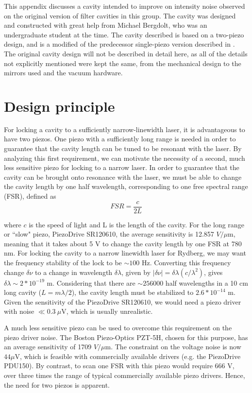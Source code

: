 This appendix discusses a cavity intended to improve on intensity noise observed on the original version of filter cavities in this group\cite{Young2022}. The cavity was designed and constructed with great help from Michael Bergdolt, who was an undergraduate student at the time. The cavity described is based on a two-piezo design, and is a modified of the predecessor single-piezo version described in \cite{kwon2019rydberg}. The original cavity design will not be described in detail here, as all of the details not explicitly mentioned were kept the same, from the mechanical design to the mirrors used and the vacuum hardware.

\section{Design principle}

For locking a cavity to a sufficiently narrow-linewidth laser, it is  advantageous to have two piezos\cite{Braverman2018}. One piezo with a sufficiently long range is needed in order to guarantee that the cavity length can be tuned to be resonant with the laser. By analyzing this first requirement, we can motivate the necessity of a second, much less sensitive piezo for locking to a narrow laser. In order to guarantee that the cavity can be brought onto resonance with the laser, we must be able to change the cavity length by one half wavelength, corresponding to one free spectral range (FSR), defined as
\begin{equation}
    FSR = \frac{c}{2L}
\end{equation}

where $c$ is the speed of light and L is the length of the cavity. For the long range or ``slow" piezo, PiezoDrive SR120610, the average sensitivity is 12.857 $V/ \mu$m, meaning that it takes about 5 V to change the cavity length by one FSR at 780 nm. 
For locking the cavity to a narrow linewidth laser for Rydberg, we may want the frequency stability of the lock to be $\sim 100$ Hz. Converting this frequency change $\delta \nu$ to a change in wavelength $\delta \lambda$, given by $|\delta \nu| = \delta\lambda(c/\lambda^2)$, gives $\delta \lambda \sim 2*10^{-19}$ m. Considering that there are $\sim 256000$ half wavelengths in a 10 cm long cavity ($L=m \lambda/2$), the cavity length must be stabilized to $2.6*10^{-14}$ m. Given the sensitivity of the PiezoDrive SR120610, we would need a piezo driver with noise $\ll 0.3~\mu$V, which is usually unrealistic.

A much less sensitive piezo can be used to overcome this requirement on the piezo driver noise. The Boston Piezo-Optics PZT-5H, chosen for this purpose, has an average sensitivity of 1709 $V/\mu$m. The constraint on the voltage noise is now $44 \mu$V, which is feasible with commercially available drivers (e.g. the PiezoDrive PDU150). By contrast, to scan one FSR with this piezo would require 666 V, over three times the range of typical commercially available piezo drivers. Hence, the need for two piezos is apparent. 

